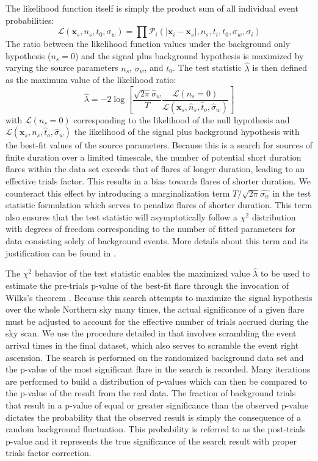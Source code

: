 \documentclass[manuscript]{aastex}
\begin{document}
The likelihood function itself is simply the product sum of all individual event probabilities:
\begin{equation}\label{eq:LLH}
\mathcal{L}(\mathbf{x}_s,n_s,t_0,\sigma_w) = \prod \mathcal{P}_i(|\mathbf{x}_i-\mathbf{x}_s|,n_s,t_i,t_0,\sigma_w,\sigma_i)
\end{equation}
The ratio between the likelihood function values under the background only hypothesis ($n_s=0$) and the signal plus background hypothesis is maximized by varying the source parameters $n_s$, $\sigma_w$, and $t_0$. The test statistic $\hat{\lambda}$ is then defined as the maximum value of the likelihood ratio:
\begin{equation}\label{eq:TS}
\hat{\lambda} = -2\log \left[\frac{\sqrt{2\pi}\hat{\sigma}_w}{T}\frac{\mathcal{L}(n_s = 0)}{\mathcal{L}(\mathbf{x}_s,\hat{n}_s,\hat{t}_o,\hat{\sigma}_w)} \right]
\end{equation}
with $\mathcal{L}(n_s = 0)$ corresponding to the likelihood of the null hypothesis and $\mathcal{L}(\mathbf{x}_s,{n}_s,\hat{t}_o,\hat{\sigma}_w)$ the likelihood of the signal plus background hypothesis with the best-fit values of the source parameters. Because this is a search for sources of finite duration over a limited timescale, the number of potential short duration flares within the data set exceeds that of flares of longer duration, leading to an effective trials factor. This results in a bias towards flares of shorter duration. We counteract this effect by introducing a marginalization term $T/\sqrt{2\pi}\hat{\sigma_w}$ in the test statistic formulation which serves to penalize flares of shorter duration. This term also ensures that the test statistic will asymptotically follow a $\chi^2$ distribution with degrees of freedom corresponding to the number of fitted parameters for data consisting solely of background events. More details about this term and its justification can be found in \cite{2010APh....33..175B}.

The $\chi^2$ behavior of the test statistic enables the maximized value $\hat{\lambda}$ to be used to estimate the pre-trials p-value of the best-fit flare through the invocation of Wilks's theorem \citep{wilks1938}. Because this search attempts to maximize the signal hypothesis over the whole Northern sky many times, the actual significance of a given flare must be adjusted to account for the effective number of trials accrued during the sky scan. We use the procedure detailed in \cite{0004-637X-807-1-46} that involves scrambling the event arrival times in the final dataset, which also serves to scramble the event right ascension. The search is performed on the randomized background data set and the p-value of the most significant flare in the search is recorded. Many iterations are performed to build a distribution of p-values which can then be compared to the p-value of the result from the real data. The fraction of background trials that result in a p-value of equal or greater significance than the observed p-value dictates the probability that the observed result is simply the consequence of a random background fluctuation. This probability is referred to as the post-trials p-value and it represents the true significance of the search result with proper trials factor correction.
\end{document}
